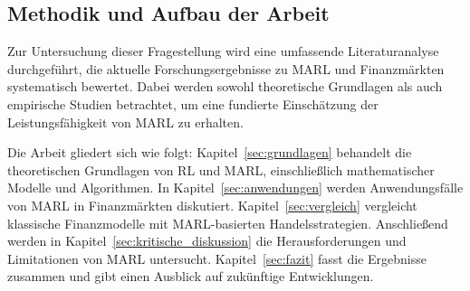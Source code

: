 \subsection{Methodik und Aufbau der Arbeit}

Zur Untersuchung dieser Fragestellung wird eine umfassende Literaturanalyse durchgeführt, die aktuelle Forschungsergebnisse zu MARL und Finanzmärkten systematisch bewertet. Dabei werden sowohl theoretische Grundlagen als auch empirische Studien betrachtet, um eine fundierte Einschätzung der Leistungsfähigkeit von MARL zu erhalten.

Die Arbeit gliedert sich wie folgt:
Kapitel~\ref{sec:grundlagen} behandelt die theoretischen Grundlagen von RL und MARL, einschließlich mathematischer Modelle und Algorithmen. In Kapitel~\ref{sec:anwendungen} werden Anwendungsfälle von MARL in Finanzmärkten diskutiert. Kapitel~\ref{sec:vergleich} vergleicht klassische Finanzmodelle mit MARL-basierten Handelsstrategien. Anschließend werden in Kapitel~\ref{sec:kritische_diskussion} die Herausforderungen und Limitationen von MARL untersucht. Kapitel~\ref{sec:fazit} fasst die Ergebnisse zusammen und gibt einen Ausblick auf zukünftige Entwicklungen.
